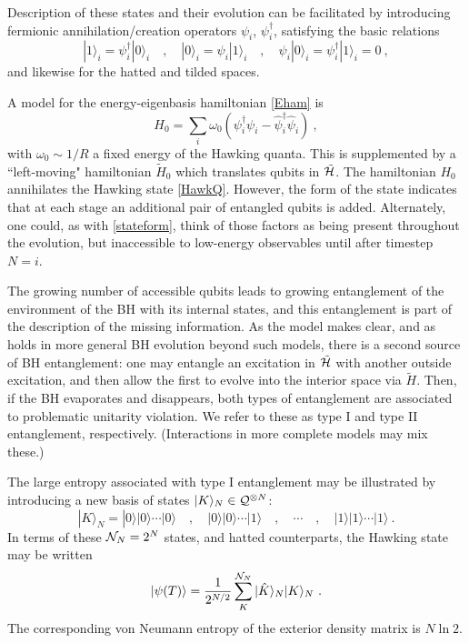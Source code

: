 \documentclass[11pt]{article}
\numberwithin{equation}{section}
\newcommand{\calh}{{\cal H}}
\newcommand{\caln}{{\cal N}}
\newcommand{\calq}{{\cal Q}}
\newcommand{\beq}{\begin{equation}}
\newcommand{\eeq}{\end{equation}}
\begin{document}
Description of these states  and their evolution can be facilitated by introducing fermionic annihilation/creation operators $\psi_i$, $\psi_i^\dagger$, satisfying the basic relations
\beq
|1\rangle_i = \psi_i^\dagger |0\rangle_i\quad ,\quad |0\rangle_i = \psi_i |1\rangle_i\quad,\quad \psi_i |0\rangle_i= \psi_i^\dagger |1\rangle_i =0\ ,
\eeq
and likewise for the hatted and tilded spaces.  

A model for the energy-eigenbasis hamiltonian \eqref{Eham} is 
\beq\label{Hzero}
H_0=\sum_i \omega_0 \left(\psi_i^\dagger \psi_i - \hat \psi_i^\dagger \hat \psi_i\right)\ ,
\eeq
with $\omega_0\sim 1/R$ a fixed energy of the Hawking quanta.  This is supplemented by a ``left-moving" hamiltonian $\tilde H_0$ which translates qubits in $\tilde \calh$.  The hamiltonian $H_0$ annihilates the Hawking state \eqref{HawkQ}.  However, the form of the state indicates that at each stage an additional pair of entangled qubits is added.  Alternately, one could, as with \eqref{stateform}, think of those factors as being present throughout the evolution, but inaccessible to low-energy observables until after timestep $N=i$.  

The growing number of accessible qubits leads to growing entanglement of the environment of the BH with its internal states, and this entanglement is part of the description of the missing information.  As the model makes clear, and as holds in more general BH evolution beyond such models, there is a second source of BH entanglement: one may entangle an excitation in $\tilde \calh$ with another outside excitation, and then allow the first to evolve into the interior space via $\tilde H$.  Then, if the BH evaporates and disappears, both types of entanglement are associated to problematic unitarity violation.  We refer to these as type I and type II entanglement, respectively.  (Interactions in more complete models may mix these.)

The large entropy associated with type I entanglement may be illustrated by introducing a new basis of states $|K\rangle_N\in \calq^{\otimes N}$:
\beq
|K\rangle_N =  |0\rangle |0\rangle\cdots  |0\rangle\quad,\quad |0\rangle |0\rangle\cdots  |1\rangle\quad ,\quad\cdots\quad,  \quad |1\rangle |1\rangle\cdots   |1\rangle\ .
\eeq
In terms of these $\caln_N=2^N$ states, and hatted counterparts, the Hawking state may be written 
\beq\label{Hawkexp}
|\psi(T)\rangle = \frac{1}{2^{N/2}}  \sum_{K}^{\caln_N}|\hat K\rangle_N  |K\rangle_N \ .
\eeq
The corresponding von Neumann entropy of the exterior density matrix is $N\ln 2$.
\end{document}
